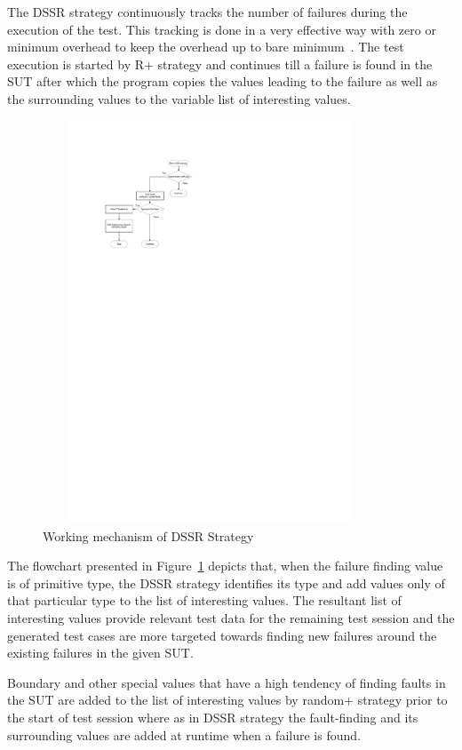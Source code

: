 The DSSR strategy continuously tracks the number of failures during the execution of the test. This tracking is done in a very effective way with zero or minimum overhead to keep the overhead up to bare minimum~\cite{Leitner2009}. The test execution is started by R+ strategy and continues till a failure is found in the SUT after which the program copies the values leading to the failure as well as the surrounding values to the variable list of interesting values. 

\begin{figure}[ht]
\centering
\includegraphics[width=10cm, height=12cm]{chapter4/flowchart1.pdf}
\caption{Working mechanism of DSSR Strategy}
\label{fig:Working_DSSS}
\end{figure}

The flowchart presented in Figure~\ref{fig:Working_DSSS} depicts that, when the failure finding value is of primitive type, the DSSR strategy identifies its type and add values only of that particular type to the list of interesting values. The resultant list of interesting values provide relevant test data for the remaining test session and the generated test cases are more targeted towards finding new failures around the existing failures in the given SUT.

Boundary and other special values that have a high tendency of finding faults in the SUT are added to the list of interesting values by random+ strategy prior to the start of test session where as in DSSR strategy the fault-finding and its surrounding values are added at runtime when a failure is found. 

